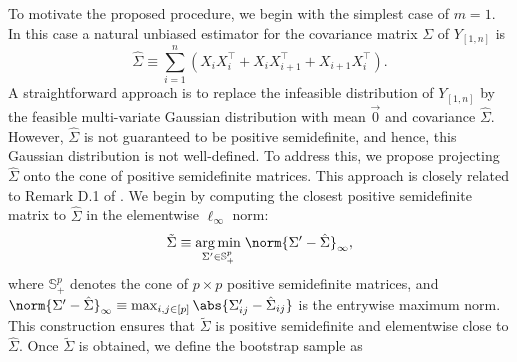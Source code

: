 \documentclass[aos]{imsart}
\begin{document}
To motivate the proposed procedure, we begin with the simplest case of $m=1$. In this case a natural unbiased estimator for the covariance matrix $\Sigma$ of $Y_{[1,n]}$ is 
\begin{equation} \label{eq:sigma_hat}
    \hat{\Sigma} 
    \equiv \sum_{i=1}^n \left( X_i X_i^\top 
    + X_i X_{i+1}^\top + X_{i+1} X_i^\top \right).
\end{equation}
A straightforward approach is to replace the infeasible distribution of $Y_{[1,n]}$ by the feasible multi-variate Gaussian distribution with mean $\vec{0}$ and covariance $\hat\Sigma$.
However, %
$\hat\Sigma$ is not guaranteed to be positive semidefinite, and hence, this Gaussian distribution is not well-defined. 
To address this, we propose projecting $\hat\Sigma$ onto the cone of positive semidefinite matrices. This approach is closely related to Remark D.1 of \citet{kock2025high}.
We begin by 
computing the closest positive semidefinite matrix to $\hat\Sigma$ in the elementwise $\ell_\infty$ norm:
\begin{equation} \label{eq:rho_tilde}
    \tilde\Sigma 
    \equiv \underset{\Sigma' \in \mathbb{S}_{+}^p}{\arg\min} \;\norm{\Sigma' - \hat\Sigma}_\infty,
\end{equation}
where $\mathbb{S}_{+}^p$ denotes the cone of $p \times p$ positive semidefinite matrices, and $\norm{\Sigma' - \hat\Sigma}_\infty \equiv \max_{i, j \in [p]} \abs{\Sigma'_{ij} - \hat\Sigma_{ij}}$ is the entrywise maximum norm.
This construction ensures that $\tilde\Sigma$ is positive semidefinite and elementwise close to $\hat\Sigma$.
Once $\tilde\Sigma$ is obtained, we define the bootstrap sample as 
\end{document}
